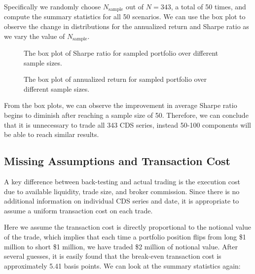 \documentclass[11pt]{article}
\theoremstyle{definition}
\begin{document}
Specifically we randomly choose $N_\text{sample}$ out of 
$N = 343$, a total of 50 times,
and compute the summary statistics for all 50 scenarios.
We can use the box plot to observe the change in 
distributions for the annualized return and Sharpe ratio
as we vary the value of $N_\text{sample}$.

\begin{figure}[h]
\begin{center}
\end{center}
\centering
\caption{\label{fg:boxplot_sharpe}
The box plot of Sharpe ratio for sampled portfolio
over different sample sizes.
}
\end{figure}

\begin{figure}[h]
\begin{center}
\end{center}
\centering
\caption{\label{fg:boxplot_return}
The box plot of annualized return for sampled portfolio
over different sample sizes.
}
\end{figure}

From the box plots, we can observe the improvement 
in average Sharpe ratio begins to diminish 
after reaching a sample size of 50.
Therefore, we can conclude that it is unnecessary 
to trade all 343 CDS series, 
instead 50-100 components will be able to reach similar results.

\subsection{Missing Assumptions and Transaction Cost}

A key difference between back-testing and 
actual trading is the execution cost
due to available liquidity, trade size, 
and broker commission.
Since there is no additional information on 
individual CDS series and date,
it is appropriate to assume a uniform 
transaction cost on each trade.

Here we assume the transaction cost is 
directly proportional to the notional value 
of the trade, 
which implies that each time a portfolio 
position flips from long \$1 million to short 
\$1 million, we have traded \$2 million 
of notional value.
After several guesses, it is easily found that 
the break-even transaction cost is approximately
5.41 basis points.
We can look at the summary statistics again:
\end{document}
